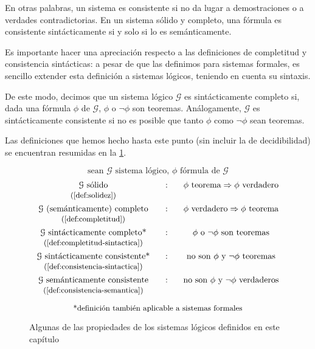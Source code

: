 En otras palabras, un sistema es consistente si no da lugar a demostraciones o a verdades contradictorias. En un sistema sólido y completo, una fórmula es consistente sintácticamente si y solo si lo es semánticamente.

Es importante hacer una apreciación respecto a las definiciones de completitud y consistencia sintácticas: a pesar de que las definimos para sistemas formales, es sencillo extender esta definición a sistemas lógicos, teniendo en cuenta su sintaxis.

De este modo, decimos que un sistema lógico $\mathcal{G}$ es sintácticamente completo si, dada una fórmula $\phi$ de $\mathcal{G}$, $\phi$ o $\neg\phi$ son teoremas. Análogamente, $\mathcal{G}$ es sintácticamente consistente si no es posible que tanto $\phi$ como $\neg\phi$ sean teoremas.

Las definiciones que hemos hecho hasta este punto (sin incluir la de decidibilidad) se encuentran resumidas en la \cref{fig:definiciones-logica}.

\vfill
\begin{figure}[H]
\centering
\vspace{8pt}
$$\text{sean }\mathcal{G}\text{ sistema lógico, }\phi \text{ fórmula de }\mathcal{G}$$
$$
\begin{matrix}
\mathcal{G}\text{ sólido} & \;\;\;:\;\;\; & \phi\text{ teorema}\Rightarrow\phi\text{ verdadero}\\
\text{\small{(\cref{def:solidez})}}\\[4pt]
\mathcal{G}\text{ (semánticamente) completo} & : & \phi\text{ verdadero}\Rightarrow\phi\text{ teorema}\\
\text{\small{(\cref{def:completitud})}}\\[4pt]
\mathcal{G}\text{ sintácticamente completo*} & : & \phi\text{ o }\neg\phi\text{ son teoremas}\\
\text{\small{(\cref{def:completitud-sintactica})}}\\[4pt]
\mathcal{G}\text{ sintácticamente consistente*} & : & \text{no son }\phi\text{ y }\neg\phi\text{ teoremas}\\
\text{\small{(\cref{def:consistencia-sintactica})}}\\[4pt]
\mathcal{G}\text{ semánticamente consistente} & : & \text{no son }\phi\text{ y }\neg\phi\text{ verdaderos}\\
\text{\small{(\cref{def:consistencia-semantica})}}\\[4pt]
\end{matrix}
$$
$$\text{\small{*definición también aplicable a sistemas formales}}$$
\caption{Algunas de las propiedades de los sistemas lógicos definidos en este capítulo}
\label{fig:definiciones-logica}
\end{figure}
\vfill
\endinput
